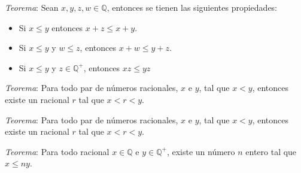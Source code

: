 \documentclass{beamer}
\begin{document}
  \begin{frame}
    \textit{Teorema}: Sean $x, y, z, w \in \mathbb{Q}$, entonces se tienen las siguientes propiedades:

    \begin{itemize}
      \item Si $x \leq y$ entonces $x + z \leq x + y$.
      \item Si $x \leq y$ y $w \leq z$, entonces $x + w \leq y + z$.
      \item Si $x \leq y$ y $z \in \mathbb{Q}^+$, entonces $xz \leq yz$
    \end{itemize}
  \end{frame}

  \begin{frame}
    \textit{Teorema}: Para todo par de números racionales, $x$ e $y$, tal que
    $x < y$, entonces existe un racional $r$ tal que $x < r < y$.
  \end{frame}

  \begin{frame}
    \textit{Teorema}: Para todo par de números racionales, $x$ e $y$, tal que
    $x < y$, entonces existe un racional $r$ tal que $x < r < y$.
    \newline\newline

    \textit{Teorema}: Para todo racional $x \in \mathbb{Q}$ e $y \in \mathbb{Q}^+$, 
    existe un número $n$ entero tal que $x \leq ny$.
  \end{frame}
\end{document}
